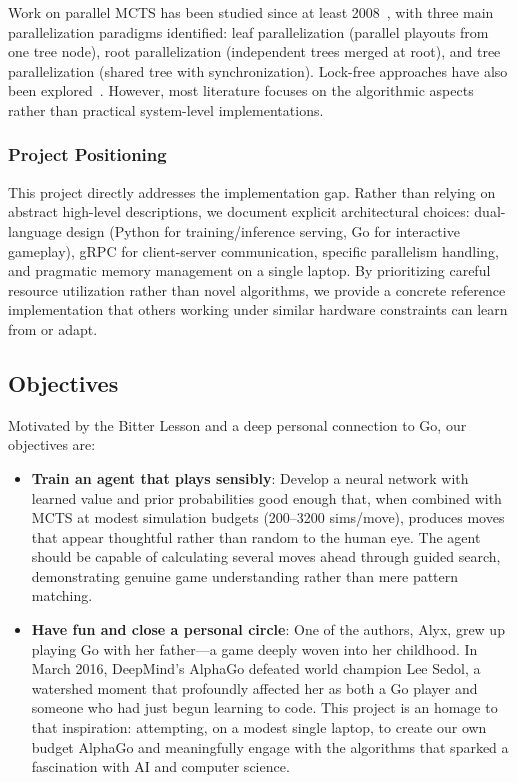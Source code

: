 \documentclass[12pt]{article}
\begin{document}
Work on parallel MCTS has been studied since at least 2008~\cite{chaslot2008}, with three main parallelization paradigms identified: leaf parallelization (parallel playouts from one tree node), root parallelization (independent trees merged at root), and tree parallelization (shared tree with synchronization). Lock-free approaches have also been explored~\cite{enzenberger2010}. However, most literature focuses on the algorithmic aspects rather than practical system-level implementations.

\subsubsection{Project Positioning}

This project directly addresses the implementation gap. Rather than relying on abstract high-level descriptions, we document explicit architectural choices: dual-language design (Python for training/inference serving, Go for interactive gameplay), gRPC for client-server communication, specific parallelism handling, and pragmatic memory management on a single laptop. By prioritizing careful resource utilization rather than novel algorithms, we provide a concrete reference implementation that others working under similar hardware constraints can learn from or adapt.

\subsection{Objectives}

Motivated by the Bitter Lesson and a deep personal connection to Go, our objectives are:

\begin{itemize}
    \item \textbf{Train an agent that plays sensibly}: Develop a neural network with learned value and prior probabilities good enough that, when combined with MCTS at modest simulation budgets (200--3200 sims/move), produces moves that appear thoughtful rather than random to the human eye. The agent should be capable of calculating several moves ahead through guided search, demonstrating genuine game understanding rather than mere pattern matching.
    
    \item \textbf{Have fun and close a personal circle}: One of the authors, Alyx, grew up playing Go with her father—a game deeply woven into her childhood. In March 2016, DeepMind's AlphaGo defeated world champion Lee Sedol, a watershed moment that profoundly affected her as both a Go player and someone who had just begun learning to code. This project is an homage to that inspiration: attempting, on a modest single laptop, to create our own budget AlphaGo and meaningfully engage with the algorithms that sparked a fascination with AI and computer science.
\end{itemize}
\end{document}
